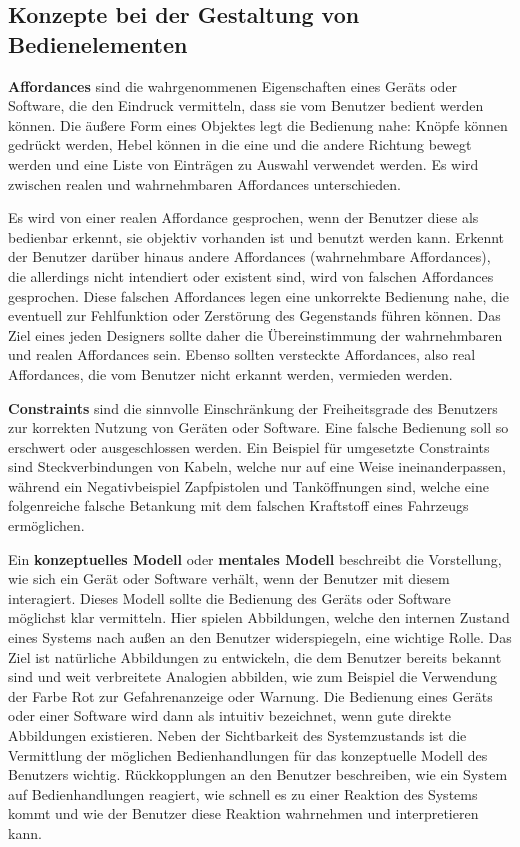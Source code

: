 \subsection{Konzepte bei der Gestaltung von Bedienelementen}
\textbf{Affordances} sind die wahrgenommenen Eigenschaften eines Geräts oder Software, die den Eindruck vermitteln, dass sie vom Benutzer bedient werden können. Die äußere Form eines Objektes legt die Bedienung nahe: Knöpfe können gedrückt werden, Hebel können in die eine und die andere Richtung bewegt werden und eine Liste von Einträgen zu Auswahl verwendet werden. Es wird zwischen realen und wahrnehmbaren Affordances unterschieden.

Es wird von einer realen Affordance gesprochen, wenn der Benutzer diese als bedienbar erkennt, sie objektiv vorhanden ist und benutzt werden kann. Erkennt der Benutzer darüber hinaus andere Affordances (wahrnehmbare Affordances), die allerdings nicht intendiert oder existent sind, wird von falschen Affordances gesprochen. Diese falschen Affordances legen eine unkorrekte Bedienung nahe, die eventuell zur Fehlfunktion oder Zerstörung des Gegenstands führen können. Das Ziel eines jeden Designers sollte daher die Übereinstimmung der wahrnehmbaren und realen Affordances sein. Ebenso sollten versteckte Affordances, also real Affordances, die vom Benutzer nicht erkannt werden, vermieden werden. \cite[S. 136 ff.]{2010.Preim}

\textbf{Constraints} sind die sinnvolle Einschränkung der Freiheitsgrade des Benutzers zur korrekten Nutzung von Geräten oder Software. Eine falsche Bedienung soll so erschwert oder ausgeschlossen werden. Ein Beispiel für umgesetzte Constraints sind Steckverbindungen von Kabeln, welche nur auf eine Weise ineinanderpassen, während ein Negativbeispiel Zapfpistolen und Tanköffnungen sind, welche eine folgenreiche falsche Betankung mit dem falschen Kraftstoff eines Fahrzeugs ermöglichen. \cite[S. 136 ff.]{2010.Preim}

Ein \textbf{konzeptuelles Modell} oder \textbf{mentales Modell} beschreibt die Vorstellung, wie sich ein Gerät oder Software verhält, wenn der Benutzer mit diesem interagiert. Dieses Modell sollte die Bedienung des Geräts oder Software möglichst klar vermitteln. Hier spielen Abbildungen, welche den internen Zustand eines Systems nach außen an den Benutzer widerspiegeln, eine wichtige Rolle. Das Ziel ist natürliche Abbildungen zu entwickeln, die dem Benutzer bereits bekannt sind und weit verbreitete Analogien abbilden, wie zum Beispiel die Verwendung der Farbe Rot zur Gefahrenanzeige oder Warnung. Die Bedienung eines Geräts oder einer Software wird dann als intuitiv bezeichnet, wenn gute direkte Abbildungen existieren. Neben der Sichtbarkeit des Systemzustands ist die Vermittlung der möglichen Bedienhandlungen für das konzeptuelle Modell des Benutzers wichtig. Rückkopplungen an den Benutzer beschreiben, wie ein System auf Bedienhandlungen reagiert, wie schnell es zu einer Reaktion des Systems kommt und wie der Benutzer diese Reaktion wahrnehmen und interpretieren kann. \cite[S. 136 ff.]{2010.Preim}

